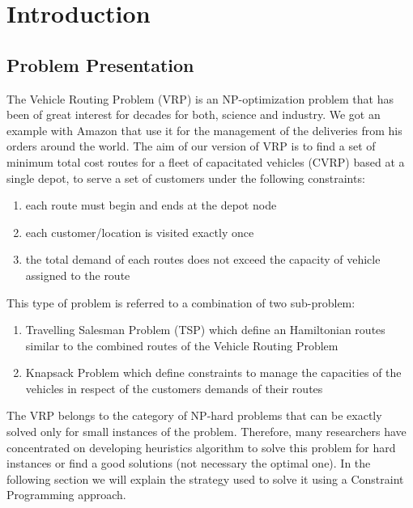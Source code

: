 \chapter{Introduction}
\section{Problem Presentation}
The Vehicle Routing Problem (VRP) is an NP-optimization problem that has been of great interest for decades for both, science and industry. We got an example with Amazon that use it for the management of the deliveries from his orders around the world. The aim of our version of VRP is to find a set of minimum total cost routes for a fleet of capacitated vehicles (CVRP) based at a single depot, to serve a set of customers under the following constraints:
\begin{enumerate}
    \item each route must begin and ends at the depot node
    \item each customer/location is visited exactly once
    \item the total demand of each routes does not exceed the capacity of vehicle assigned to the route
\end{enumerate}
This type of problem is referred to a combination of two sub-problem:
\begin{enumerate}
    \item Travelling Salesman Problem (TSP) which define an Hamiltonian routes similar to the combined routes of the Vehicle Routing Problem
    \item Knapsack Problem which define constraints to manage the capacities of the vehicles in respect of the customers demands of their routes
\end{enumerate}
The VRP belongs to the category of NP-hard problems that can be exactly solved only for small instances of the problem. Therefore, many researchers have concentrated on developing heuristics algorithm to solve this problem for hard instances or find a good solutions (not necessary the optimal one). In the following section we will explain the strategy used to solve it using a Constraint Programming approach.
\newpage
